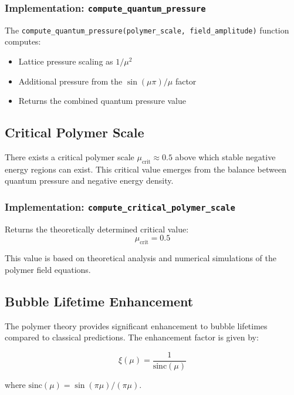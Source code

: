 \subsubsection{Implementation: \texttt{compute\_quantum\_pressure}}

The \texttt{compute\_quantum\_pressure(polymer\_scale, field\_amplitude)} function computes:
\begin{itemize}
\item Lattice pressure scaling as $1/\mu^2$
\item Additional pressure from the $\sin(\mu\pi)/\mu$ factor
\item Returns the combined quantum pressure value
\end{itemize}

\subsection{Critical Polymer Scale}

There exists a critical polymer scale $\mu_{\text{crit}} \approx 0.5$ above which stable negative energy regions can exist. This critical value emerges from the balance between quantum pressure and negative energy density.

\subsubsection{Implementation: \texttt{compute\_critical\_polymer\_scale}}

Returns the theoretically determined critical value:
\begin{equation}
\mu_{\text{crit}} = 0.5
\end{equation}

This value is based on theoretical analysis and numerical simulations of the polymer field equations.

\subsection{Bubble Lifetime Enhancement}

The polymer theory provides significant enhancement to bubble lifetimes compared to classical predictions. The enhancement factor is given by:

\begin{equation}
\xi(\mu) = \frac{1}{\text{sinc}(\mu)}
\end{equation}

where $\text{sinc}(\mu) = \sin(\pi\mu)/(\pi\mu)$.

